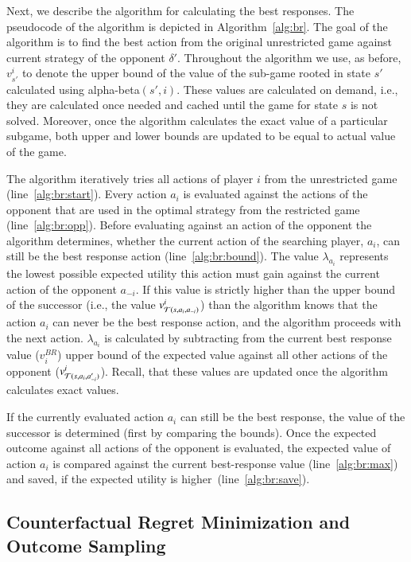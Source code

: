 Next, we describe the algorithm for calculating the best responses. 
The pseudocode of the algorithm is depicted in Algorithm~\ref{alg:br}.
The goal of the algorithm is to find the best action from the original unrestricted game against current strategy of the opponent $\delta'$. 
Throughout the algorithm we use, as before, $v^i_{s'}$ to denote the upper bound of the value of the sub-game rooted in state $s'$ calculated using alpha-beta$(s',i)$. These values are calculated on demand, i.e., they are calculated once needed and cached until the game for state $s$ is not solved.
Moreover, once the algorithm calculates the exact value of a particular subgame, both upper and lower bounds are updated to be equal to actual value of the game. 

The algorithm iteratively tries all actions of player $i$ from the unrestricted game (line~\ref{alg:br:start}). 
Every action $a_i$ is evaluated against the actions of the opponent that are used in the optimal strategy from the restricted game (line~\ref{alg:br:opp}).
Before evaluating against an action of the opponent the algorithm determines, whether the current action of the searching player, $a_i$, can still be the best response action (line~\ref{alg:br:bound}). 
The value $\lambda_{a_i}$ represents the lowest possible expected utility this action must gain against the current action of the opponent $a_{-i}$. 
If this value is strictly higher than the upper bound of the successor (i.e., the value $v^i_{\mathcal{T}(s,a_i,a_{-i})}$) than the algorithm knows that the action $a_i$ can never be the best response action, and the algorithm proceeds with the next action.
$\lambda_{a_i}$ is calculated by subtracting from the current best response value ($v_i^{BR}$) upper bound of the expected value against all other actions of the opponent ($v^i_{\mathcal{T}(s,a_i,a'_{-i})}$). Recall, that these values are updated once the algorithm calculates exact values.

If the currently evaluated action $a_i$ can still be the best response, the value of the successor is determined (first by comparing the bounds). Once the expected outcome against all actions of the opponent is evaluated, the expected value of action $a_i$ is compared against the current best-response value (line~\ref{alg:br:max}) and saved, if the expected utility is higher~(line~\ref{alg:br:save}).

\subsection{Counterfactual Regret Minimization and Outcome Sampling} \label{sec:algs:cfros}

